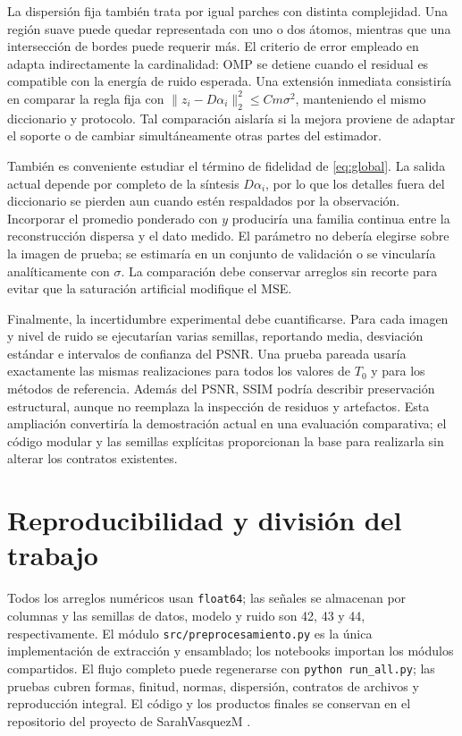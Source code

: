 \documentclass[conference]{IEEEtran}
\begin{document}
La dispersión fija también trata por igual parches con distinta complejidad. Una región suave puede quedar representada con uno o dos átomos, mientras que una intersección de bordes puede requerir más. El criterio de error empleado en \cite{elad} adapta indirectamente la cardinalidad: OMP se detiene cuando el residual es compatible con la energía de ruido esperada. Una extensión inmediata consistiría en comparar la regla fija con $\|z_i-D\alpha_i\|_2^2\leq C m\sigma^2$, manteniendo el mismo diccionario y protocolo. Tal comparación aislaría si la mejora proviene de adaptar el soporte o de cambiar simultáneamente otras partes del estimador.

También es conveniente estudiar el término de fidelidad de \eqref{eq:global}. La salida actual depende por completo de la síntesis $D\alpha_i$, por lo que los detalles fuera del diccionario se pierden aun cuando estén respaldados por la observación. Incorporar el promedio ponderado con $y$ produciría una familia continua entre la reconstrucción dispersa y el dato medido. El parámetro no debería elegirse sobre la imagen de prueba; se estimaría en un conjunto de validación o se vincularía analíticamente con $\sigma$. La comparación debe conservar arreglos sin recorte para evitar que la saturación artificial modifique el MSE.

Finalmente, la incertidumbre experimental debe cuantificarse. Para cada imagen y nivel de ruido se ejecutarían varias semillas, reportando media, desviación estándar e intervalos de confianza del PSNR. Una prueba pareada usaría exactamente las mismas realizaciones para todos los valores de $T_0$ y para los métodos de referencia. Además del PSNR, SSIM podría describir preservación estructural, aunque no reemplaza la inspección de residuos y artefactos. Esta ampliación convertiría la demostración actual en una evaluación comparativa; el código modular y las semillas explícitas proporcionan la base para realizarla sin alterar los contratos existentes.

\section{Reproducibilidad y división del trabajo}
Todos los arreglos numéricos usan \texttt{float64}; las señales se almacenan por columnas y las semillas de datos, modelo y ruido son 42, 43 y 44, respectivamente. El módulo \texttt{src/preprocesamiento.py} es la única implementación de extracción y ensamblado; los notebooks importan los módulos compartidos. El flujo completo puede regenerarse con \texttt{python run\_all.py}; las pruebas cubren formas, finitud, normas, dispersión, contratos de archivos y reproducción integral. El código y los productos finales se conservan en el repositorio del proyecto de SarahVasquezM \cite{repositorio}.
\end{document}
